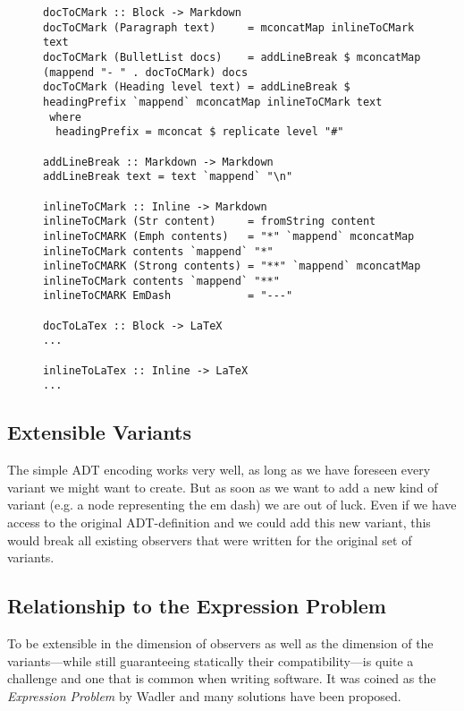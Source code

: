 \begin{figure}
\begin{lstlisting}
docToCMark :: Block -> Markdown
docToCMark (Paragraph text)     = mconcatMap inlineToCMark text
docToCMark (BulletList docs)    = addLineBreak $ mconcatMap (mappend "- " . docToCMark) docs
docToCMark (Heading level text) = addLineBreak $ headingPrefix `mappend` mconcatMap inlineToCMark text
 where
  headingPrefix = mconcat $ replicate level "#"

addLineBreak :: Markdown -> Markdown
addLineBreak text = text `mappend` "\n"

inlineToCMark :: Inline -> Markdown
inlineToCMark (Str content)     = fromString content
inlineToCMARK (Emph contents)   = "*" `mappend` mconcatMap inlineToCMark contents `mappend` "*"
inlineToCMARK (Strong contents) = "**" `mappend` mconcatMap inlineToCMark contents `mappend` "**"
inlineToCMARK EmDash            = "---"

docToLaTex :: Block -> LaTeX
...

inlineToLaTex :: Inline -> LaTeX
...
\end{lstlisting}
\end{figure}


\clearpage

\subsection{Extensible Variants}
\label{sec:orgccbaf12}

The simple ADT encoding works very well, as long as we have foreseen every
variant we might want to create. But as soon as we want to add a new kind of
variant (e.g. a node representing the em dash) we are out of luck. Even if we
have access to the original ADT-definition and we could add this new variant,
this would break all existing observers that were written for the original set
of variants.

\subsection{Relationship to the Expression Problem}
\label{sec:orgb21dca4}

To be extensible in the dimension of observers as well as the dimension of the
variants—while still guaranteeing statically their compatibility—is quite a
challenge and one that is common when writing software. It was coined as the
\emph{Expression Problem} by Wadler \cite{expression-problem} and many solutions
have been proposed.

